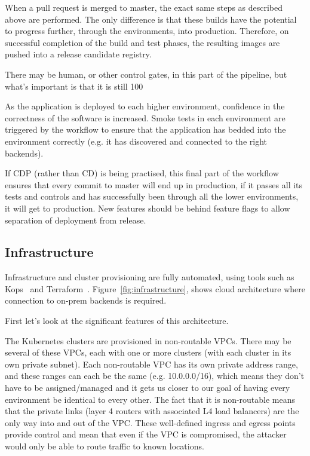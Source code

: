 \documentclass[reprint,amsmath,amssymb,aps]{revtex4-1}
\begin{document}
When a pull request is merged to master, the exact same steps as described above are performed. The only difference is that these builds have the potential to progress further, through the environments, into production. Therefore, on successful completion of the build and test phases, the resulting images are pushed into a release candidate registry.

There may be human, or other control gates, in this part of the pipeline, but what’s important is that it is still 100%

As the application is deployed to each higher environment, confidence in the correctness of the software is increased. Smoke tests in each environment are triggered by the workflow to ensure that the application has bedded into the environment correctly (e.g. it has discovered and connected to the right backends).

If CDP (rather than CD) is being practised, this final part of the workflow ensures that every commit to master will end up in production, if it passes all its tests and controls and has successfully been through all the lower environments, it will get to production. New features should be behind feature flags to allow separation of deployment from release.

\subsection{\label{sec:infrastructure}Infrastructure}

Infrastructure and cluster provisioning are fully automated, using tools such as Kops~\cite{kubernet77:online} and Terraform~\cite{Terrafor77:online}. Figure~\ref{fig:infrastructure}, shows cloud architecture where connection to on-prem backends is required.

First let’s look at the significant features of this architecture.

The Kubernetes clusters are provisioned in non-routable VPCs. There may be several of these VPCs, each with one or more clusters (with each cluster in its own private subnet). Each non-routable VPC has its own private address range, and these ranges can each be the same (e.g. 10.0.0.0/16), which means they don’t have to be assigned/managed and it gets us closer to our goal of having every environment be identical to every other. The fact that it is non-routable means that the private links (layer 4 routers with associated L4 load balancers) are the only way into and out of the VPC. These well-defined ingress and egress points provide control and mean that even if the VPC is compromised, the attacker would only be able to route traffic to known locations.
\end{document}

